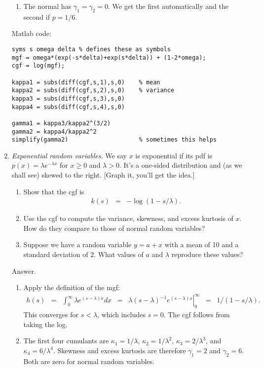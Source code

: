 \documentclass[11pt]{article}
\begin{document}
\begin{enumerate}
\begin{enumerate}
\item The normal has $\gamma_1 = \gamma_2 = 0$.
We get the first automatically and the second if $p = 1/6$.
\end{enumerate}
Matlab code:
\begin{verbatim}
syms s omega delta % defines these as symbols
mgf = omega*(exp(-s*delta)+exp(s*delta)) + (1-2*omega);
cgf = log(mgf);

kappa1 = subs(diff(cgf,s,1),s,0)    % mean
kappa2 = subs(diff(cgf,s,2),s,0)    % variance
kappa3 = subs(diff(cgf,s,3),s,0)
kappa4 = subs(diff(cgf,s,4),s,0)

gamma1 = kappa3/kappa2^(3/2)
gamma2 = kappa4/kappa2^2
simplify(gamma2)                    % sometimes this helps
\end{verbatim}


\item {\it Exponential random variables.\/}
We say $x$ is exponential if its pdf is
$ %
    p(x) = \lambda e^{-\lambda x}
$ %
for $x \geq 0$ and $\lambda > 0$.
It's a one-sided distribution and (as we shall see) skewed to the right.
[Graph it, you'll get the idea.]
%
\begin{enumerate}
\item Show that the cgf is
\begin{eqnarray*}
    k(s)  &=& - \log \left( 1 - s/\lambda \right) .
\end{eqnarray*}
\item Use the cgf to compute the variance, skewness, and excess kurtosis
of $x$.  How do they compare to those of normal random variables?
\item Suppose we have a random variable $ y = a + x$
with  a mean of 10 and a standard deviation of 2.
What values of $a$ and $\lambda$ reproduce these values?
\end{enumerate}

Answer.
\begin{enumerate}
\item Apply the definition of the mgf:
\begin{eqnarray*}
    h(s) &=& \int_{0}^{\infty} \lambda e^{(s-\lambda)x} dx
            \;\;=\;\; \left. \lambda (s-\lambda)^{-1} e^{(s-\lambda)x} \right|_0^\infty
            \;\;=\;\; 1/(1-s/\lambda) .
\end{eqnarray*}
This converges for $s<\lambda$, which includes $s=0$.
The cgf follows from taking the log.
\item The first four cumulants are
$\kappa_1 = 1/\lambda$,
$\kappa_2 = 1/\lambda^2$,
$\kappa_3 = 2/\lambda^3$,
and $\kappa_4 = 6/\lambda^4$.
Skewness and excess kurtosis are therefore
$\gamma_1 = 2$ and $\gamma_2 = 6$.
Both are zero for normal random variables.


\end{enumerate}
\end{enumerate}
\end{document}
